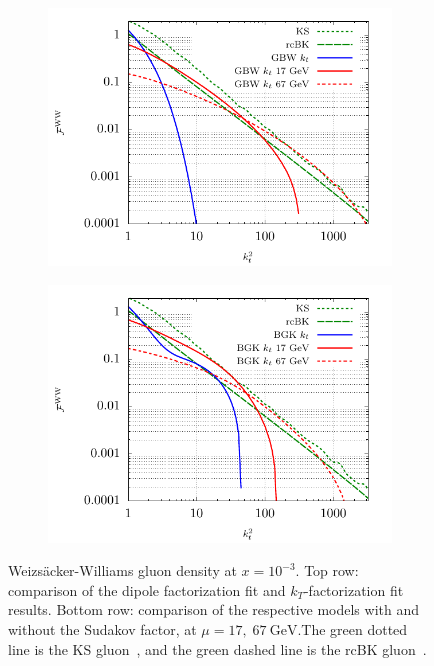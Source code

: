 \documentclass[11pt]{article}
\begin{document}
\begin{figure}[t]
\begin{subfigure}{0.5\textwidth}
        \includegraphics[width=\textwidth]{plots/GBWWW2} 
    \end{subfigure}
    \begin{subfigure}{0.5\textwidth}
        \includegraphics[width=\textwidth]{plots/BGKWW2} 
    \end{subfigure}
    \caption{ Weizs\"acker-Williams gluon density at $x=10^{-3}$. Top row:
    comparison of the dipole factorization fit and $k_T$-factorization fit
    results. Bottom row: comparison of the respective models with and without
    the Sudakov factor, at $\mu=17,\;67\ \mathrm{GeV}$.The green dotted line is the KS gluon~\cite{vanHameren:2021sqc}, and the green dashed line is the rcBK gluon~\cite{Hentschinski:2022rsa}. }
    \label{fig:ww}
\end{figure}
\end{document}
